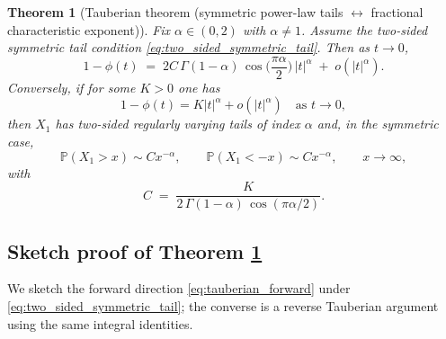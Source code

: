 \documentclass[11pt]{article}
\newtheorem{theorem}{Theorem}
\begin{document}
\begin{theorem}[Tauberian theorem (symmetric power-law tails $\leftrightarrow$ fractional characteristic exponent)]\label{thm:tauberian_symmetric}
Fix $\alpha\in(0,2)$ with $\alpha\neq 1$. Assume the two-sided symmetric tail condition \eqref{eq:two_sided_symmetric_tail}. Then as $t\to 0$,
\begin{equation}\label{eq:tauberian_forward}
1-\phi(t)
\;=\;
2C\,\Gamma(1-\alpha)\,\cos\!\Big(\frac{\pi\alpha}{2}\Big)\,|t|^\alpha
\;+\; o(|t|^\alpha).
\end{equation}
Conversely, if for some $K>0$ one has
\begin{equation}\label{eq:tauberian_converse_assump}
1-\phi(t) = K|t|^\alpha + o(|t|^\alpha)
\quad \text{as } t\to 0,
\end{equation}
then $X_1$ has two-sided regularly varying tails of index $\alpha$ and, in the symmetric case,
\begin{equation}\label{eq:tauberian_converse_tail}
{\mathbb P}(X_1>x)\sim C x^{-\alpha},
\qquad
{\mathbb P}(X_1<-x)\sim C x^{-\alpha},
\qquad x\to\infty,
\end{equation}
with
\begin{equation}\label{eq:C_from_K}
C \;=\; \frac{K}{2\,\Gamma(1-\alpha)\,\cos(\pi\alpha/2)}.
\end{equation}
\end{theorem}

\subsection{Sketch proof of Theorem \ref{thm:tauberian_symmetric}}\label{subsec:tauberian_proof_sketch}

We sketch the forward direction \eqref{eq:tauberian_forward} under \eqref{eq:two_sided_symmetric_tail}; the converse is a reverse Tauberian argument using the same integral identities.
\end{document}
